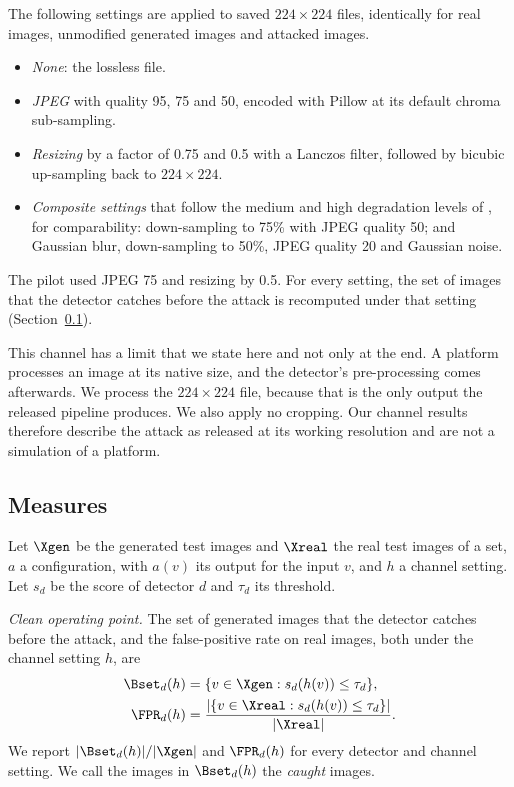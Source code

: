The following settings are applied to saved $224\times224$ files, identically for real images,
unmodified generated images and attacked images.
\begin{itemize}
\item \emph{None}: the lossless file.
\item \emph{JPEG} with quality 95, 75 and 50, encoded with Pillow at its default chroma
sub-sampling.
\item \emph{Resizing} by a factor of 0.75 and 0.5 with a Lanczos filter, followed by bicubic
up-sampling back to $224\times224$.
\item \emph{Composite settings} that follow the medium and high degradation levels of
, for comparability: down-sampling to 75\% with JPEG quality 50;
and Gaussian blur, down-sampling to 50\%, JPEG quality 20 and Gaussian noise.
\end{itemize}
The pilot used JPEG 75 and resizing by 0.5. For every setting, the set of images that the detector
catches before the attack is recomputed under that setting (Section~\ref{sec:metrics}).

This channel has a limit that we state here and not only at the end. A platform processes an image
at its native size, and the detector's pre-processing comes afterwards. We process the
$224\times224$ file, because that is the only output the released pipeline produces. We also apply
no cropping. Our channel results therefore describe the attack as released at its working
resolution and are not a simulation of a platform.

\subsection{Measures}
\label{sec:metrics}

Let $\Xgen$ be the generated test images and $\Xreal$ the real test images of a set, $a$ a
configuration, with $a(v)$ its output for the input $v$, and $h$ a channel setting. Let $s_d$ be
the score of detector $d$ and $\tau_d$ its threshold.

\emph{Clean operating point.} The set of generated images that the detector catches before the
attack, and the false-positive rate on real images, both under the channel setting $h$, are
\begin{align}
  \Bset_d(h) &= \{v\in\Xgen : s_d(h(v))\le\tau_d\}, \label{eq:detected}\\
  \FPR_d(h) &= \frac{|\{v\in\Xreal : s_d(h(v))\le\tau_d\}|}{|\Xreal|}. \label{eq:fpr}
\end{align}
We report $|\Bset_d(h)|/|\Xgen|$ and $\FPR_d(h)$ for every detector and channel setting. We call
the images in $\Bset_d(h)$ the \emph{caught} images.

